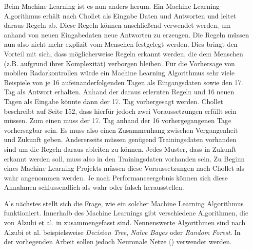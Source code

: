 Beim Machine Learning ist es nun anders herum.
Ein Machine Learning Algorithmus erhält nach Chollet als Eingabe Daten und Antworten und leitet daraus Regeln ab.
Diese Regeln können anschließend verwendet werden, um anhand von neuen Eingabedaten neue Antworten zu erzeugen.
Die Regeln müssen nun also nicht mehr explizit vom Menschen festgelegt werden.
Dies bringt den Vorteil mit sich, dass möglicherweise Regeln erkannt werden, die dem Menschen (z.B. aufgrund ihrer Komplexität) verborgen bleiben.
Für die Vorhersage von mobilen Radarkontrollen würde ein Machine Learning Algorithmus sehr viele Beispiele von je 16 aufeinanderfolgenden Tagen als Eingangsdaten sowie den 17. Tag als Antwort erhalten.
Anhand der daraus erlernten Regeln und 16 neuen Tagen als Eingabe könnte dann der 17. Tag vorhergesagt werden.
Chollet beschreibt auf Seite 152, dass hierfür jedoch zwei Voraussetzungen erfüllt sein müssen.
Zum einen muss der 17. Tag anhand der 16 vorhergegangenen Tage vorhersagbar sein.
Es muss also einen Zusammenhang zwischen Vergangenheit und Zukunft geben.
Andererseits müssen genügend Trainingsdaten vorhanden sind um die Regeln daraus ableiten zu können.
Jedes Muster, dass in Zukunft erkannt werden soll, muss also in den Trainingsdaten vorhanden sein.
Zu Beginn eines Machine Learning Projekts müssen diese Voraussetzungen nach Chollet als wahr angenommen werden.
Je nach Performanceergebnis können sich diese Annahmen schlussendlich als wahr oder falsch herausstellen.

Als nächstes stellt sich die Frage, wie ein solcher Machine Learning Algorithmus funktioniert.
Innerhalb des Machine Learnings gibt verschiedene Algorithmen, die von Alzubi et al. in \cite{MachineLearningOverview} zusammengefasst sind.
Nennenswerte Algorithmen sind nach Alzubi et al. beispielsweise \emph{Decision Tree}, \emph{Na\"ive Bayes} oder \emph{Random Forest}.
In der vorliegenden Arbeit sollen jedoch Neuronale Netze () verwendet werden.

